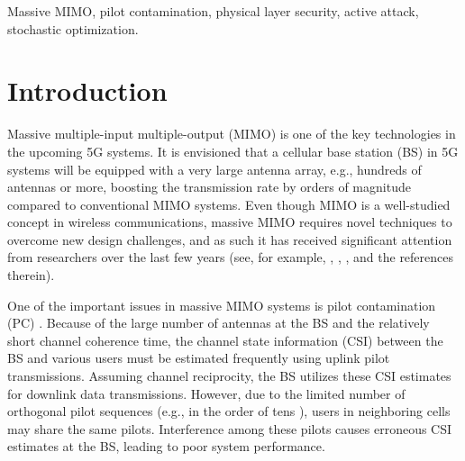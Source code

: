 \documentclass[draftclsnofoot, 12pt, onecolumn, journal]{IEEEtran}
\begin{document}
\begin{IEEEkeywords}
Massive MIMO, pilot contamination, physical layer security, active attack, stochastic optimization.
\end{IEEEkeywords}


\maketitle

\section{Introduction}

Massive multiple-input multiple-output (MIMO) is one of the key technologies in the upcoming 5G systems.
It is envisioned that a cellular base station (BS) in 5G systems will be equipped with a very large antenna array, e.g., hundreds of antennas or more, boosting
the transmission rate by orders of magnitude compared to conventional MIMO systems.
Even though MIMO is a well-studied concept in wireless communications, massive MIMO requires novel techniques to overcome new design challenges, and as such it has received significant attention from researchers over the last few years (see, for example, \cite{Bj2016}, \cite{Larsson2014}, \cite{Lu2014}, and the references therein).

One of the important issues in massive MIMO systems is pilot contamination (PC) \cite{Marzetta2010}.
Because of the large number of antennas at the BS and the relatively short channel coherence time, the channel state information (CSI) between the BS and various users must be estimated frequently using uplink pilot transmissions.
Assuming channel reciprocity, the BS utilizes these CSI estimates for downlink data transmissions.
However, due to the limited number of orthogonal pilot sequences (e.g., in the order of tens \cite{Marzetta2010}), users in neighboring cells may share the same pilots.
Interference among these pilots causes erroneous CSI estimates at the BS, leading to poor system performance. 
\end{document}
